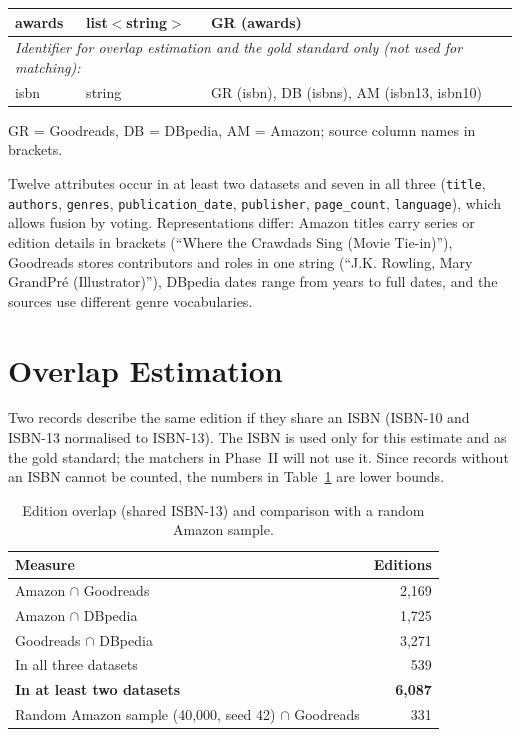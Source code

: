 \documentclass[runningheads]{llncs}
\begin{document}
\begin{table}[htbp]
\begin{threeparttable}
\begin{tabularx}{\textwidth}{|l|l|>{\RaggedRight\arraybackslash}X|}
awards            & list$<$string$>$ & GR (awards) \\
\hline
\multicolumn{3}{|l|}{\emph{Identifier for overlap estimation and the gold standard only (not used for matching):}} \\
isbn              & string           & GR (isbn), DB (isbns), AM (isbn13, isbn10) \\
\hline
\end{tabularx}
\begin{tablenotes}
  \footnotesize GR = Goodreads, DB = DBpedia, AM = Amazon; source column names in brackets.
\end{tablenotes}
\end{threeparttable}
\end{table}

Twelve attributes occur in at least two datasets and seven in all three
(\texttt{title}, \texttt{authors}, \texttt{genres}, \texttt{publication\_date},
\texttt{publisher}, \texttt{page\_count}, \texttt{language}), which allows
fusion by voting. Representations differ: Amazon titles carry series or edition
details in brackets (``Where the Crawdads Sing (Movie Tie-in)''), Goodreads
stores contributors and roles in one string (``J.K. Rowling, Mary GrandPr\'e
(Illustrator)''), DBpedia dates range from years to full dates, and the
sources use different genre vocabularies.

\section{Overlap Estimation}

Two records describe the same edition if they share an ISBN (ISBN-10 and
ISBN-13 normalised to ISBN-13). The ISBN is used only for this estimate and as
the gold standard; the matchers in Phase~II will not use it. Since records
without an ISBN cannot be counted, the numbers in Table~\ref{tab:overlap} are
lower bounds.

\begin{table}[htbp]
\centering
\caption{Edition overlap (shared ISBN-13) and comparison with a random Amazon sample.}
\label{tab:overlap}
\footnotesize
\begin{tabular}{lr}
\toprule
\textbf{Measure} & \textbf{Editions} \\
\midrule
Amazon $\cap$ Goodreads & 2,169 \\
Amazon $\cap$ DBpedia & 1,725 \\
Goodreads $\cap$ DBpedia & 3,271 \\
In all three datasets & 539 \\
\textbf{In at least two datasets} & \textbf{6,087} \\
\midrule
Random Amazon sample (40,000, seed 42) $\cap$ Goodreads & 331 \\
\bottomrule
\end{tabular}
\end{table}
\end{document}
